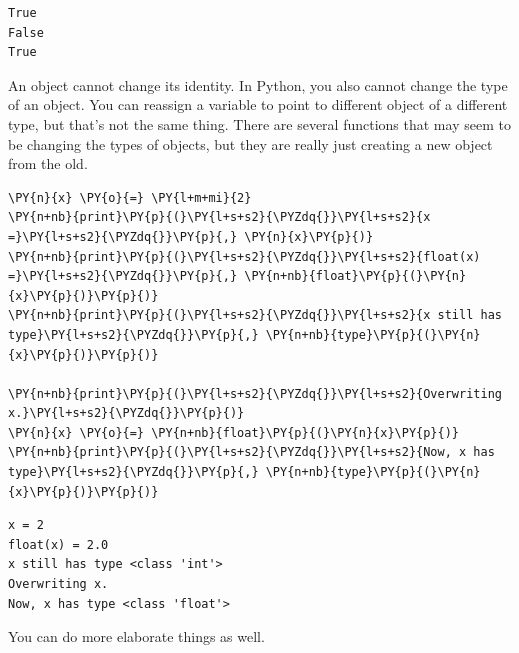 \begin{Verbatim}
True
False
True

\end{Verbatim}


An object cannot change its identity.
In Python, you also cannot change the type of an object.
You can reassign a variable to point to different object of a different type, but that's not the same thing.
There are several functions that may seem to be changing the types of objects, but they are really just creating a new object from the old.


\begin{Verbatim}[commandchars=\\\{\}]
\PY{n}{x} \PY{o}{=} \PY{l+m+mi}{2}
\PY{n+nb}{print}\PY{p}{(}\PY{l+s+s2}{\PYZdq{}}\PY{l+s+s2}{x =}\PY{l+s+s2}{\PYZdq{}}\PY{p}{,} \PY{n}{x}\PY{p}{)}
\PY{n+nb}{print}\PY{p}{(}\PY{l+s+s2}{\PYZdq{}}\PY{l+s+s2}{float(x) =}\PY{l+s+s2}{\PYZdq{}}\PY{p}{,} \PY{n+nb}{float}\PY{p}{(}\PY{n}{x}\PY{p}{)}\PY{p}{)}
\PY{n+nb}{print}\PY{p}{(}\PY{l+s+s2}{\PYZdq{}}\PY{l+s+s2}{x still has type}\PY{l+s+s2}{\PYZdq{}}\PY{p}{,} \PY{n+nb}{type}\PY{p}{(}\PY{n}{x}\PY{p}{)}\PY{p}{)}

\PY{n+nb}{print}\PY{p}{(}\PY{l+s+s2}{\PYZdq{}}\PY{l+s+s2}{Overwriting x.}\PY{l+s+s2}{\PYZdq{}}\PY{p}{)}
\PY{n}{x} \PY{o}{=} \PY{n+nb}{float}\PY{p}{(}\PY{n}{x}\PY{p}{)}
\PY{n+nb}{print}\PY{p}{(}\PY{l+s+s2}{\PYZdq{}}\PY{l+s+s2}{Now, x has type}\PY{l+s+s2}{\PYZdq{}}\PY{p}{,} \PY{n+nb}{type}\PY{p}{(}\PY{n}{x}\PY{p}{)}\PY{p}{)}
\end{Verbatim}

\begin{Verbatim}
x = 2
float(x) = 2.0
x still has type <class 'int'>
Overwriting x.
Now, x has type <class 'float'>

\end{Verbatim}


You can do more elaborate things as well.


